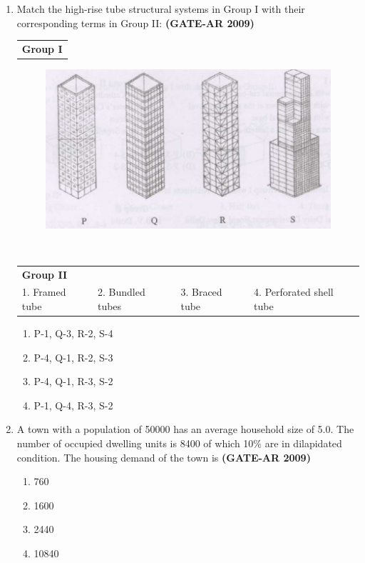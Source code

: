 \documentclass[a4paper,10pt]{article}
\begin{document}
\begin{enumerate}
    \item Match the high-rise tube structural systems in Group I with their corresponding terms in Group II: \hfill \textbf{(GATE-AR 2009)} \\
    \begin{tabular}{ l }
	\textbf{Group I} \\
	\end{tabular}
	\begin{figure}[h!]
        \centering
        \includegraphics[width=0.5\linewidth]{figs/img_02.jpg}
        \label{fig:Img02}
    \end{figure} \\
    \begin{tabular}{ l l l l }
	\textbf{Group II} & & & \\
	1. Framed tube & 2. Bundled tubes & 3. Braced tube & 4. Perforated shell tube \\
	\end{tabular}
	\begin{multicols}{2}
	\begin{enumerate}
        \item P-1, Q-3, R-2, S-4
        \item P-4, Q-1, R-2, S-3
        \item P-4, Q-1, R-3, S-2
        \item P-1, Q-4, R-3, S-2
    \end{enumerate}
	\end{multicols}

    \item A town with a population of 50000 has an average household size of 5.0. The number of occupied dwelling units is 8400 of which 10\% are in dilapidated condition. The housing demand of the town is \hfill \textbf{(GATE-AR 2009)}
    \begin{multicols}{4}
	\begin{enumerate}
        \item 760
        \item 1600
        \item 2440
        \item 10840
    \end{enumerate}
	\end{multicols}


\end{enumerate}
\end{document}
